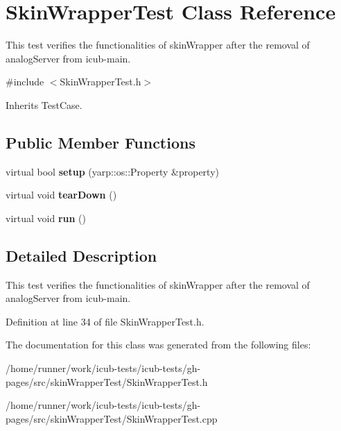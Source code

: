 \section{Skin\+Wrapper\+Test Class Reference}
\label{classSkinWrapperTest}


This test verifies the functionalities of skin\+Wrapper after the removal of analog\+Server from icub-\/main.  




{\ttfamily \#include $<$Skin\+Wrapper\+Test.\+h$>$}



Inherits Test\+Case.

\subsection*{Public Member Functions}
\begin{DoxyCompactItemize}
\item 
\mbox{\label{classSkinWrapperTest_aa22a01cedaf43f2a9b19d8837379de99}} 
virtual bool {\bfseries setup} (yarp\+::os\+::\+Property \&property)
\item 
\mbox{\label{classSkinWrapperTest_ac79f439b54f8f4d3268cc9c63765b852}} 
virtual void {\bfseries tear\+Down} ()
\item 
\mbox{\label{classSkinWrapperTest_a5ffdc900a2af2b9371626f0b2588d65a}} 
virtual void {\bfseries run} ()
\end{DoxyCompactItemize}


\subsection{Detailed Description}
This test verifies the functionalities of skin\+Wrapper after the removal of analog\+Server from icub-\/main. 

Definition at line 34 of file Skin\+Wrapper\+Test.\+h.



The documentation for this class was generated from the following files\+:\begin{DoxyCompactItemize}
\item 
/home/runner/work/icub-\/tests/icub-\/tests/gh-\/pages/src/skin\+Wrapper\+Test/Skin\+Wrapper\+Test.\+h\item 
/home/runner/work/icub-\/tests/icub-\/tests/gh-\/pages/src/skin\+Wrapper\+Test/Skin\+Wrapper\+Test.\+cpp\end{DoxyCompactItemize}
